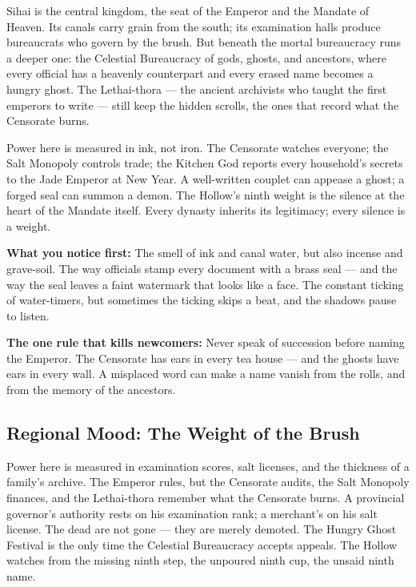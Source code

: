 \vspace{2mm}
\begin{tcolorbox}[colback=black!3,colframe=blue!60!black,title={Theme \& Atmosphere},breakable]
Sihai is the central kingdom, the seat of the Emperor and the Mandate of Heaven. Its canals carry grain from the south; its examination halls produce bureaucrats who govern by the brush. But beneath the mortal bureaucracy runs a deeper one: the Celestial Bureaucracy of gods, ghosts, and ancestors, where every official has a heavenly counterpart and every erased name becomes a hungry ghost. The Lethai-thora --- the ancient archivists who taught the first emperors to write --- still keep the hidden scrolls, the ones that record what the Censorate burns.

Power here is measured in ink, not iron. The Censorate watches everyone; the Salt Monopoly controls trade; the Kitchen God reports every household's secrets to the Jade Emperor at New Year. A well-written couplet can appease a ghost; a forged seal can summon a demon. The Hollow's ninth weight is the silence at the heart of the Mandate itself. Every dynasty inherits its legitimacy; every silence is a weight.

\vspace{2mm}
\textbf{What you notice first:} The smell of ink and canal water, but also incense and grave-soil. The way officials stamp every document with a brass seal --- and the way the seal leaves a faint watermark that looks like a face. The constant ticking of water-timers, but sometimes the ticking skips a beat, and the shadows pause to listen.

\textbf{The one rule that kills newcomers:} Never speak of succession before naming the Emperor. The Censorate has ears in every tea house --- and the ghosts have ears in every wall. A misplaced word can make a name vanish from the rolls, and from the memory of the ancestors.
\end{tcolorbox}

\subsection*{Regional Mood: The Weight of the Brush}

Power here is measured in examination scores, salt licenses, and the thickness of a family's archive. The Emperor rules, but the Censorate audits, the Salt Monopoly finances, and the Lethai-thora remember what the Censorate burns. A provincial governor's authority rests on his examination rank; a merchant's on his salt license. The dead are not gone --- they are merely demoted. The Hungry Ghost Festival is the only time the Celestial Bureaucracy accepts appeals. The Hollow watches from the missing ninth step, the unpoured ninth cup, the unsaid ninth name.

